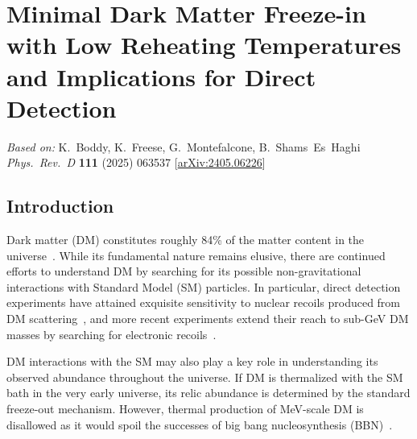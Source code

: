 \chapter{Minimal Dark Matter Freeze-in with Low Reheating Temperatures and Implications for Direct Detection}
\label{ch:minimal-dm-freezein}

\begin{center}
\textit{Based on:} K.~Boddy, K.~Freese, G.~Montefalcone, B.~Shams~Es~Haghi\\
\textit{Phys.\ Rev.\ D} \textbf{111} (2025) 063537
[\href{https://arxiv.org/abs/2405.06226}{arXiv:2405.06226}]
\end{center}
\vspace{1em}

\section{Introduction}
\label{sec:ch8-intro}

Dark matter (DM) constitutes roughly 84\% of  the matter content in the universe~\cite{Planck:2018vyg}. While its fundamental nature remains elusive, there are continued efforts to understand DM by searching for its possible non-gravitational interactions with Standard Model (SM) particles. In particular, direct detection experiments have attained exquisite sensitivity to nuclear recoils produced from DM scattering~\cite{PandaX-II:2017hlx,XENON:2018voc,Hambye:2018dpi,LZ:2022lsv}, and more recent experiments extend their reach to sub-GeV DM masses by searching for electronic recoils~\cite{PandaX-II:2017hlx,PandaX:2022xqx,DAMIC-M:2023gxo,DAMIC-M:2023hgj,SENSEI:2020dpa,DarkSide:2022knj,XENON:2018voc}.

DM interactions with the SM may also play a key role in understanding its observed abundance throughout the universe. If DM is thermalized with the SM bath in the very early universe, its relic abundance is determined by the standard freeze-out mechanism. However, thermal production of MeV-scale DM is disallowed as it would spoil the successes of big bang nucleosynthesis (BBN)~\cite{Boehm:2013jpa,Nollett:2013pwa,Steigman:2014pfa,An:2022sva}.

